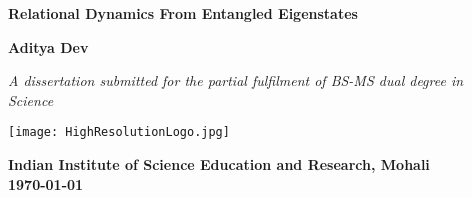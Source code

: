 \begin{titlepage}

    \begin{center}
        \sffamily
        \LARGE
        \textbf{Relational Dynamics From Entangled Eigenstates}
        \vspace{1cm}
        
        \Large
        \textbf{Aditya Dev}
    
        \vspace{1cm}
        \large
        
        \textit{A dissertation submitted for the partial fulfilment of
        BS-MS dual degree in Science}
        
        \vspace{3.5cm}
    
        \texttt{[image: HighResolutionLogo.jpg]}
        \vspace{1cm}
        
        \large
        \textbf{Indian Institute of Science Education and Research, Mohali}\\
        \large
        \textbf{\today} 
    
    \end{center}
    
    
    \end{titlepage}